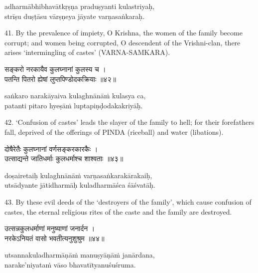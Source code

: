 \begin{transliteration}
adharmābhibhavātkṛṣṇa praduṣyanti kulastriyaḥ, \\
strīṣu duṣṭāsu vārṣṇeya jāyate varṇasaṅkaraḥ.
\end{transliteration}

41. By the prevalence of impiety, O Krishna, the women of the family become
corrupt; and women being corrupted, O descendent of the Vrishni-clan, there
arises `intermingling of castes' (VARNA-SAMKARA).

\begin{gitaverse}
सङ्करो नरकायैव कुलघ्नानां कुलस्य च । \\
पतन्ति पितरो ह्येषां लुप्तपिण्डोदकक्रियाः ॥४२॥
\end{gitaverse}

\begin{transliteration}
saṅkaro narakāyaiva kulaghnānāṁ kulasya ca, \\
patanti pitaro hyeṣāṁ luptapiṇḍodakakriyāḥ.
\end{transliteration}

42. `Confusion of castes' leads the slayer of the family to hell; for their
forefathers fall, deprived of the offerings of PINDA (riceball) and water
(libations).

\begin{gitaverse}
दोषैरेतैः कुलघ्नानां वर्णसङ्करकारकैः । \\
उत्साद्यन्ते जातिधर्माः कुलधर्माश्च शाश्वताः ॥४३॥
\end{gitaverse}

\begin{transliteration}
doṣairetaiḥ kulaghnānāṁ varṇasaṅkarakārakaiḥ, \\
utsādyante jātidharmāḥ kuladharmāśca śāśvatāḥ.
\end{transliteration}

43. By these evil deeds of the `destroyers of the family', which cause
confusion of castes, the eternal religious rites of the caste and the family
are destroyed.

\begin{gitaverse}
उत्सन्नकुलधर्माणां मनुष्याणां जनार्दन । \\
नरकेऽनियतं वासो भवतीत्यनुशुश्रुम ॥४४॥
\end{gitaverse}

\begin{transliteration}
utsannakuladharmāṇāṁ manuṣyāṇāṁ janārdana, \\
narake'niyataṁ vāso bhavatītyanuśuśruma.
\end{transliteration}

